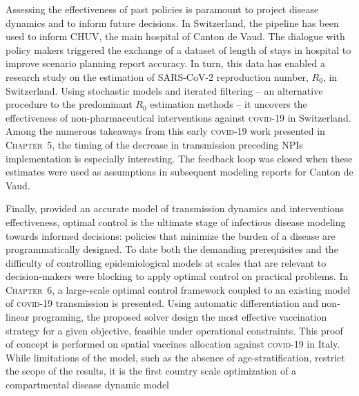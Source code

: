 Assessing the effectiveness of past policies is paramount to project disease dynamics and to inform future decisions. In Switzerland, the pipeline has been used to inform CHUV, the main hospital of Canton de Vaud. The dialogue with policy makers triggered the exchange of a dataset of length of stays in hospital to improve scenario planning report accuracy. In turn, this data has enabled a research study on the estimation of SARS-CoV-2 reproduction number, $R_0$, in Switzerland. Using stochastic models and iterated filtering -- an alternative procedure to the predominant $R_0$ estimation methods -- it uncovers the effectiveness of non-pharmaceutical interventions against \textsc{covid-19} in Switzerland. Among the numerous takeaways from this early \textsc{covid}-19 work presented in \textsc{Chapter~5}, the timing of the decrease in transmission preceding NPIs implementation is especially interesting. The feedback loop was closed when these estimates were used as assumptions in subsequent modeling reports for Canton de Vaud.

Finally, provided an accurate model of transmission dynamics and interventions effectiveness, optimal control is the ultimate stage of infectious disease modeling towards informed decisions: policies that minimize the burden of a disease are programmatically designed. To date both the demanding prerequisites and the difficulty of controlling epidemiological models at scales that are relevant to decision-makers were blocking to apply optimal control on practical problems. In \textsc{Chapter~6}, a large-scale optimal control framework coupled to an existing model of \textsc{covid}-19 transmission\cite{Gatto:SpreadDynamicsCOVID19:2020,Bertuzzo:GeographyCOVID19Spread:2020} is presented.  Using automatic differentiation and non-linear programing, the proposed solver design the most effective vaccination strategy for a given objective, feasible under operational constraints. This proof of concept is performed on spatial vaccines allocation against \textsc{covid}-19 in Italy. While limitations of the model, such as the absence of age-stratification, restrict the scope of the results, it is the first country scale optimization of a compartmental disease dynamic model %


